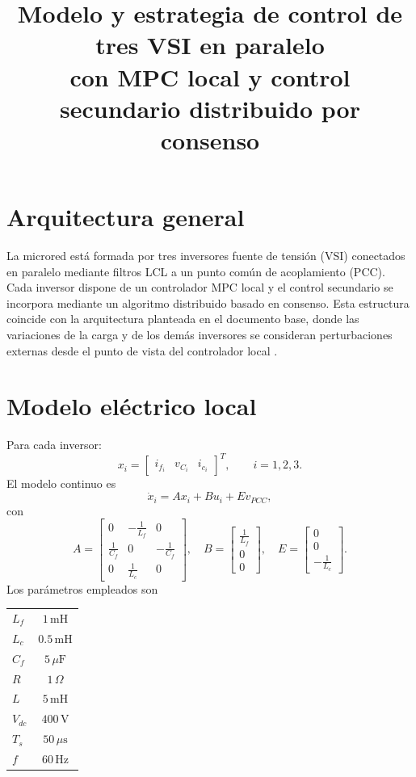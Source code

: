 \documentclass[12pt,a4paper]{article}
\title{Modelo y estrategia de control de tres VSI en paralelo\\con MPC local y control secundario distribuido por consenso}
\author{}
\date{}
\begin{document}
\maketitle

\section{Arquitectura general}
La microred está formada por tres inversores fuente de tensión (VSI) conectados en paralelo mediante filtros LCL a un punto común de acoplamiento (PCC). Cada inversor dispone de un controlador MPC local y el control secundario se incorpora mediante un algoritmo distribuido basado en consenso. Esta estructura coincide con la arquitectura planteada en el documento base, donde las variaciones de la carga y de los demás inversores se consideran perturbaciones externas desde el punto de vista del controlador local \cite{tesis}.

\section{Modelo eléctrico local}
Para cada inversor:
\begin{equation}
x_i=\begin{bmatrix}i_{f_i}&v_{C_i}&i_{c_i}\end{bmatrix}^{T},\qquad i=1,2,3.
\end{equation}
El modelo continuo es
\begin{equation}
\dot{x}_i=Ax_i+Bu_i+Ev_{PCC},
\end{equation}
con
\begin{equation}
A=\begin{bmatrix}0&-\frac{1}{L_f}&0\\\frac{1}{C_f}&0&-\frac{1}{C_f}\\0&\frac{1}{L_c}&0\end{bmatrix},\quad
B=\begin{bmatrix}\frac{1}{L_f}\\0\\0\end{bmatrix},\quad
E=\begin{bmatrix}0\\0\\-\frac{1}{L_c}\end{bmatrix}.
\end{equation}
Los parámetros empleados son
\begin{center}
\begin{tabular}{lc}\toprule
$L_f$&$1\,\mathrm{mH}$\\
$L_c$&$0.5\,\mathrm{mH}$\\
$C_f$&$5\,\mu\mathrm{F}$\\
$R$&$1\,\Omega$\\
$L$&$5\,\mathrm{mH}$\\
$V_{dc}$&$400\,\mathrm{V}$\\
$T_s$&$50\,\mu\mathrm{s}$\\
$f$&$60\,\mathrm{Hz}$\\
\bottomrule\end{tabular}
\end{center}
\end{document}
